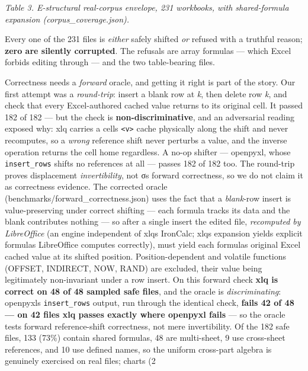 \documentclass[
]{article}
\begin{document}
\emph{Table 3. E-structural real-corpus envelope, 231 workbooks, with
shared-formula expansion (corpus\_coverage.json).}

Every one of the 231 files is \emph{either} safely shifted \emph{or}
refused with a truthful reason; \textbf{zero are silently corrupted}.
The refusals are array formulas --- which Excel forbids editing through
--- and the two table-bearing files.

Correctness needs a \emph{forward} oracle, and getting it right is part
of the story. Our first attempt was a \emph{round-trip}: insert a blank
row at \emph{k}, then delete row \emph{k}, and check that every
Excel-authored cached value returns to its original cell. It passed 182
of 182 --- but the check is \textbf{non-discriminative}, and an
adversarial reading exposed why: xlq carries a cell\textquotesingle s
\texttt{\textless{}v\textgreater{}} cache physically along the shift and
never recomputes, so a \emph{wrong} reference shift never perturbs a
value, and the inverse operation returns the cell home regardless. A
no-op shifter --- openpyxl, whose \texttt{insert\_rows} shifts no
references at all --- passes 182 of 182 too. The round-trip proves
displacement \emph{invertibility}, not σ\textquotesingle s forward
correctness, so we do not claim it as correctness evidence. The
corrected oracle (benchmarks/forward\_correctness.json) uses the fact
that a \emph{blank}-row insert is value-preserving under correct
shifting --- each formula tracks its data and the blank contributes
nothing --- so after a single insert the edited file, \emph{recomputed
by LibreOffice} (an engine independent of xlq\textquotesingle s
IronCalc; xlq\textquotesingle s expansion yields explicit formulas
LibreOffice computes correctly), must yield each
formula\textquotesingle s original Excel cached value at its shifted
position. Position-dependent and volatile functions (OFFSET, INDIRECT,
NOW, RAND) are excluded, their value being legitimately non-invariant
under a row insert. On this forward check \textbf{xlq is correct on 48
of 48 sampled safe files}, and the oracle is \emph{discriminating}:
openpyxl\textquotesingle s \texttt{insert\_rows} output, run through the
identical check, \textbf{fails 42 of 48 --- on 42 files xlq passes
exactly where openpyxl fails} --- so the oracle tests forward
reference-shift correctness, not mere invertibility. Of the 182 safe
files, 133 (73\%) contain shared formulas, 48 are multi-sheet, 9 use
cross-sheet references, and 10 use defined names, so the uniform
cross-part algebra is genuinely exercised on real files; charts (2
\end{document}
